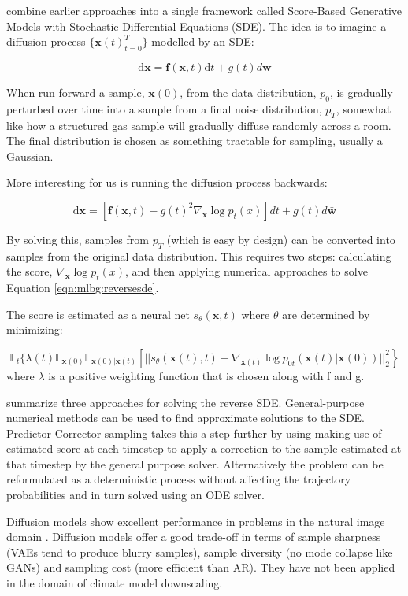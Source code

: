 \textcite{song2021sbgmsde} combine earlier approaches \cite{song2019smld, ho2020ddpm} into a single framework called Score-Based Generative Models with Stochastic Differential Equations (SDE). The idea is to imagine a diffusion process \(\{\mathbf{x}(t)_{t=0}^{T}\}\) modelled by an SDE:

\begin{equation}
  \mathrm{d}\mathbf{x} = \mathbf{f}(\mathbf{x}, t)\mathrm{d}t + g(t)d\mathbf{w}
\end{equation}

When run forward a sample, \(\mathbf{x}(0)\), from the data distribution, \(p_0\), is gradually perturbed over time into a sample from a final noise distribution, \(p_T\), somewhat like how a structured gas sample will gradually diffuse randomly across a room. The final distribution is chosen as something tractable for sampling, usually a Gaussian.

More interesting for us is running the diffusion process backwards:

\begin{equation} \label{eqn:mlbg:reversesde}
  \mathrm{d}\mathbf{x} = [\mathbf{f}(\mathbf{x}, t) - g(t)^2 \nabla_{\mathbf{x}}\log{p_{t}(x)}]{d}t + g(t)d\bar{\mathbf{w}}
\end{equation}

By solving this, samples from \(p_T\) (which is easy by design) can be converted into samples from the original data distribution. This requires two steps: calculating the score, \(\nabla_{\mathbf{x}}\log{p_{t}(x)}\), and then applying numerical approaches to solve Equation \ref{eqn:mlbg:reversesde}.

The score is estimated as a neural net \(s_\theta(\mathbf{x}, t)\) where \(\theta\) are determined by minimizing:

\begin{equation}
  \mathbb{E}_t \{
    \lambda(t) \mathbb{E}_{\mathbf{x}(0)} \mathbb{E}_{\mathbf{x}(0) | \mathbf{x}(t)}
      \left[
        || s_\theta(\mathbf{x}(t), t) -  \nabla_{\mathbf{x}(t)}\log{p_{0t}(\mathbf{x}(t) | \mathbf{x}(0))} ||_2^2
      \right
    \}
\end{equation}
where \(\lambda\) is a positive weighting function that is chosen along with f and g.

\textcite{song2021sbgmsde} summarize three approaches for solving the reverse SDE. General-purpose numerical methods can be used to find approximate solutions to the SDE. Predictor-Corrector sampling takes this a step further by using making use of estimated score at each timestep to apply a correction to the sample estimated at that timestep by the general purpose solver. Alternatively the problem can be reformulated as a deterministic process without affecting the trajectory probabilities and in turn solved using an ODE solver.

Diffusion models show excellent performance in problems in the natural image domain \cite{dharwial2021diffbeatsgans, song2021sbgmsde}. Diffusion models offer a good trade-off in terms of sample sharpness (VAEs tend to produce blurry samples), sample diversity (no mode collapse like GANs) and sampling cost (more efficient than AR). They have not been applied in the domain of climate model downscaling.
